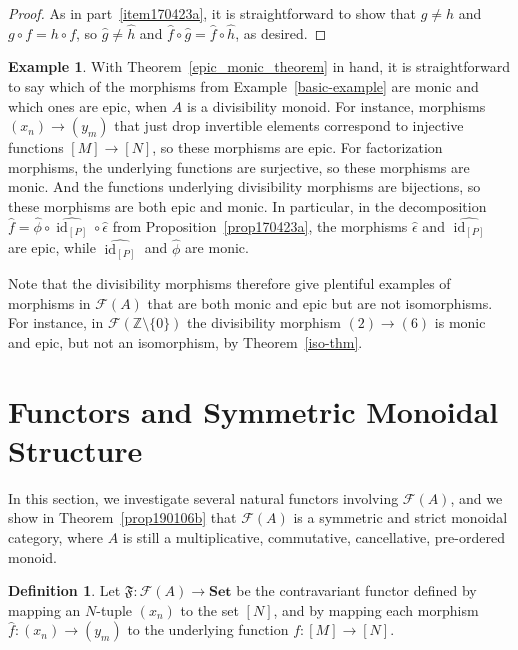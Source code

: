 \documentclass[reqno]{amsart}
\theoremstyle{plain}
\theoremstyle{definition}
\newtheorem{defn}[lem]{Definition}
\newtheorem{ex}[lem]{Example}
\newcommand{\cat}[1]{\mathcal{#1}}
\newcommand{\catf}{\cat{F}}
\newcommand{\id}{\operatorname{id}}
\newcommand{\bbz}{\mathbb{Z}}
\newcommand{\catset}{\mathbf{Set}}
\numberwithin{equation}{lem}
\begin{document}
\begin{proof}
As in part~\eqref{item170423a}, it is straightforward to show that $g\neq h$ and $g\circ f=h\circ f$, so 
$\hat g\neq\hat h$ and $\hat f\circ\hat g=\hat f\circ\hat h$,
as desired.
\end{proof}

\begin{ex}
With Theorem~\ref{epic_monic_theorem} in hand, it is straightforward to 
say which of the morphisms from Example~\ref{basic-example} are monic and which ones are epic,
when $A$ is a divisibility monoid.
For instance, morphisms $(x_n)\to(y_m)$ that just drop invertible elements correspond to injective functions $[M]\to[N]$,
so these morphisms are epic.
For factorization morphisms, the underlying functions are surjective, so these morphisms are monic.
And the functions underlying divisibility morphisms are bijections, so these morphisms are both epic and monic.
In particular, in the decomposition $\hat f=\hat\phi\circ\widehat{\id_{[P]}}\circ\hat\epsilon$ from Proposition~\ref{prop170423a},
the morphisms $\hat\epsilon$ and $\widehat{\id_{[P]}}$ are epic, while $\widehat{\id_{[P]}}$ and $\hat\phi$ are monic.

Note that the divisibility morphisms therefore give plentiful examples of morphisms in $\catf(A)$ that are both monic and
epic but are not isomorphisms. For instance, in $\catf(\bbz\setminus\{0\})$ the divisibility morphism $(2)\to(6)$
is monic and epic, but not an isomorphism,
by
Theorem~\ref{iso-thm}.
\label{ex:retracts}
\end{ex}


\section{Functors
and Symmetric Monoidal Structure}
\label{sec170415a}

In this section, we investigate several natural functors involving $\catf(A)$,
and we show in Theorem~\ref{prop190106b} that $\catf(A)$ is a symmetric and strict monoidal category,
where $A$ is still a multiplicative, commutative, cancellative, pre-ordered monoid.

\begin{defn}\label{presheaf}
Let $\mathfrak{F}\colon\mathcal{F}(A) \to \catset$ be the contravariant functor defined by mapping an $N$-tuple 
$(x_n)$ to the set $[N]$, and by mapping each morphism $\hat{f}\colon(x_n) \to (y_m)$ to the underlying function 
$f\colon[M] \to [N]$.
\end{defn}
\end{document}
